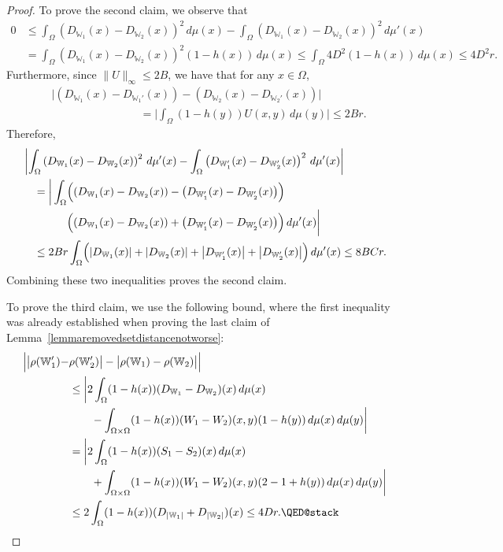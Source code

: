 \documentclass{amsart}
\numberwithin{equation}{section}
\numberwithin{figure}{section}
\theoremstyle{definition}
\theoremstyle{remark}
\newcommand{\cW}{\mathbb{W}}
\begin{document}
\begin{proof}
To prove the second claim, we observe that
\begin{align*}
0&\le
\int_{\Omega} (D_{\cW_1}(x)-D_{\cW_2}(x))^2 \,d\mu(x) - \int_{\Omega} (D_{\cW_1}(x)-D_{\cW_2}(x))^2 \,d\mu'(x)
\\
&=\int_{\Omega} (D_{\cW_1}(x)-D_{\cW_2}(x))^2 (1-h(x)) \,d\mu(x)
\leq
\int_{\Omega}{4}D^2(1-h(x))\,d\mu(x)
\le {4}D^2r.
\end{align*}
Furthermore, since $\|U\|_\infty \le 2B$, we have that for any $x\in \Omega$,
\begin{align*}
&\biggl|\left(D_{\cW_1}(x)-D_{\cW_1'}(x)\right)-\left(D_{\cW_2}(x)-D_{\cW_2'}(x)\right)\biggr|
\\
&\qquad\qquad\qquad\qquad= \biggl|\int_{\Omega} (1-h(y)) U(x,y) \,d\mu(y)\biggr|\leq 2Br.
\end{align*}
Therefore,
\begin{align*}
&\left|\int_{\Omega}\left(D_{\cW_1}(x)-D_{\cW_2}(x)\right)^2 \,d\mu'(x)
 -\int_{\Omega}\left(D_{\cW_1'}(x)-D_{\cW_2'}(x)\right)^2 \,d\mu'(x) \right|
\\
&\quad
=\bigg|\int_{\Omega} \Bigl(\left(D_{\cW_1}(x)-D_{\cW_2}(x)\right)-\left(D_{\cW_1'}(x)-D_{\cW_2'}(x)\right)\Bigr)
\\
 &\qquad\qquad\Bigl(\left(D_{\cW_1}(x)-D_{\cW_2}(x)\right)+\left(D_{\cW_1'}(x)-D_{\cW_2'}(x)\right)\Bigr) \,d\mu'(x) \bigg|
\\
&\quad
\le 2Br\int_{\Omega}
\Bigl(\left|D_{\cW_1}(x)\right|+\left|D_{\cW_2}(x)\right|
   +\left|D_{\cW_1'}(x)\right|+\left|D_{\cW_2'}(x)\right|\Bigr) \,d\mu'(x)
\le
8BCr
.
\end{align*}
Combining these two inequalities proves the second claim.

To prove the third claim, we use the following bound, where the first
inequality was already established when proving the last claim of
Lemma~\ref{lemmaremovedsetdistancenotworse}:
\begin{align*}
\Bigl|\bigl|{\rho(\cW'_1)}-&{\rho(\cW'_2)}\bigr|-\bigl|{\rho(\cW_1)-\rho(\cW_2)}\bigr|\Bigr|\\
&\le \biggl|2\int_{\Omega} (1-h(x))(D_{\cW_1}-D_{\cW_2})(x) \,d\mu(x)\biggr.\\
&\qquad
-
\biggl.\int_{\Omega \times \Omega}(1-h(x))(W_1-W_2)(x,y)(1-h(y))\,d\mu(x)\,d\mu(y) \biggr|
\\
&=\biggl|2\int_{\Omega} (1-h(x))(S_1-S_2)(x) \,d\mu(x)
\biggr.
\\
&\qquad
+
\biggl.\int_{\Omega \times \Omega}(1-h(x))(W_1-W_2)(x,y)(2-1+h(y))\,d\mu(x)\,d\mu(y) \biggr|\\
&\le 2\int_\Omega (1-h(x))(D_{|\cW_1|}+D_{|\cW_2|})(x)\leq 4Dr. \qedhere
\end{align*}
\end{proof}
\end{document}
